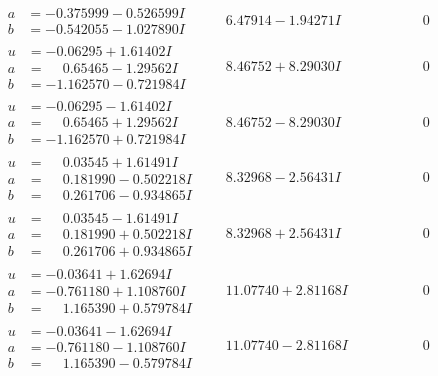 \documentclass[1p]{elsarticle_modified}
\theoremstyle{definition}
\begin{document}
$$\begin{array}{c|c|c}
\begin{aligned}
a &= -0.375999 - 0.526599 I \\
b &= -0.542055 - 1.027890 I\end{aligned}
 & \phantom{-}6.47914 - 1.94271 I & \phantom{-0.000000 } 0 \\ \hline\begin{aligned}
u &= -0.06295 + 1.61402 I \\
a &= \phantom{-}0.65465 - 1.29562 I \\
b &= -1.162570 - 0.721984 I\end{aligned}
 & \phantom{-}8.46752 + 8.29030 I & \phantom{-0.000000 } 0 \\ \hline\begin{aligned}
u &= -0.06295 - 1.61402 I \\
a &= \phantom{-}0.65465 + 1.29562 I \\
b &= -1.162570 + 0.721984 I\end{aligned}
 & \phantom{-}8.46752 - 8.29030 I & \phantom{-0.000000 } 0 \\ \hline\begin{aligned}
u &= \phantom{-}0.03545 + 1.61491 I \\
a &= \phantom{-}0.181990 - 0.502218 I \\
b &= \phantom{-}0.261706 - 0.934865 I\end{aligned}
 & \phantom{-}8.32968 - 2.56431 I & \phantom{-0.000000 } 0 \\ \hline\begin{aligned}
u &= \phantom{-}0.03545 - 1.61491 I \\
a &= \phantom{-}0.181990 + 0.502218 I \\
b &= \phantom{-}0.261706 + 0.934865 I\end{aligned}
 & \phantom{-}8.32968 + 2.56431 I & \phantom{-0.000000 } 0 \\ \hline\begin{aligned}
u &= -0.03641 + 1.62694 I \\
a &= -0.761180 + 1.108760 I \\
b &= \phantom{-}1.165390 + 0.579784 I\end{aligned}
 & \phantom{-}11.07740 + 2.81168 I & \phantom{-0.000000 } 0 \\ \hline\begin{aligned}
u &= -0.03641 - 1.62694 I \\
a &= -0.761180 - 1.108760 I \\
b &= \phantom{-}1.165390 - 0.579784 I\end{aligned}
 & \phantom{-}11.07740 - 2.81168 I & \phantom{-0.000000 } 0\\

\end{array}$$
\end{document}
